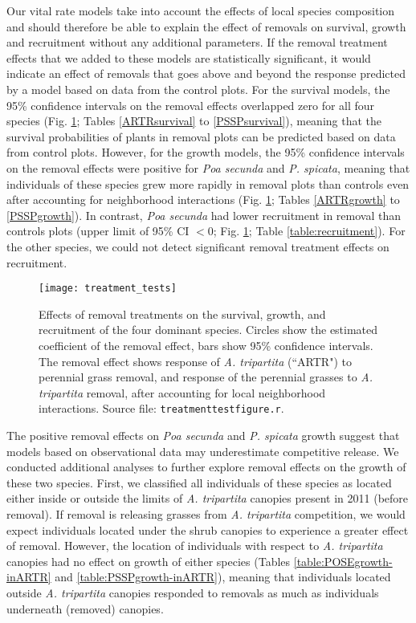\documentclass[11pt]{article}
\begin{document}
\begin{doublespacing}
Our vital rate models take into account the effects of local species composition and should therefore be able to explain the effect of removals on survival, growth and recruitment without any additional parameters. If the removal treatment effects that we added to these models are statistically significant, it would indicate an effect of removals that goes above and beyond the response predicted by a model based on data from the control plots. For the survival models, the 95\% confidence intervals on the removal effects overlapped zero for all four species (Fig. \ref{fig:VitalRateTest}; Tables \ref{ARTRsurvival} to \ref{PSSPsurvival}), meaning that the survival probabilities of plants in removal plots can be predicted based on data from control plots. However, for the growth models, the 95\% confidence intervals on the removal effects were positive for \textit{Poa secunda}  and \textit{P. spicata}, meaning that individuals of these species grew more rapidly in removal plots than controls even after accounting for neighborhood interactions (Fig. \ref{fig:VitalRateTest}; Tables \ref{ARTRgrowth} to \ref{PSSPgrowth}). In contrast, \textit{Poa secunda} had lower recruitment in removal than controls plots (upper limit of 95\% CI $<0$; Fig. \ref{fig:VitalRateTest}; Table \ref{table:recruitment}). For the other species, we could not detect significant removal treatment effects on recruitment.

 \begin{figure}[tbp]
 \centering
 \texttt{[image: treatment\_tests]}
 \caption{Effects of removal treatments on the survival, growth, and recruitment of the four dominant species. Circles show the estimated coefficient of the removal effect, bars show 95\% confidence intervals. The removal effect shows response of \textit{A. tripartita} (``ARTR") to perennial grass removal, and response of the perennial grasses to \textit{A. tripartita} removal, after accounting for local neighborhood interactions. 
 Source file: \texttt{treatment\textunderscore test\textunderscore figure.r}.}
 \label{fig:VitalRateTest}
 \end{figure}

The positive removal effects on \textit{Poa secunda}  and \textit{P. spicata} growth suggest that models based on observational data may underestimate competitive release. We conducted additional analyses to further explore removal effects on the growth of these two species. First, we classified all individuals of these species as located either inside or outside the limits of \textit{A. tripartita} canopies present in 2011 (before removal). If removal is releasing grasses from \textit{A. tripartita} competition, we would expect individuals located under the shrub canopies to experience a greater effect of removal. However, the location of individuals with respect to \textit{A. tripartita} canopies had no effect on growth of either species (Tables \ref{table:POSEgrowth-inARTR} and \ref{table:PSSPgrowth-inARTR}), meaning that individuals located outside \textit{A. tripartita} canopies responded to removals as much as individuals underneath (removed) canopies. 


\end{doublespacing}
\end{document}
